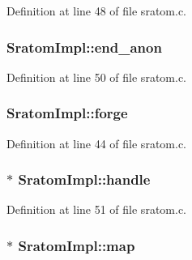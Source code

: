 Definition at line 48 of file sratom.\+c.

\subsubsection[{\texorpdfstring{end\+\_\+anon}{end_anon}}]{ Sratom\+Impl\+::end\+\_\+anon}\hypertarget{struct_sratom_impl_a25160f17a4038f0129c9423cca760684}{}\label{struct_sratom_impl_a25160f17a4038f0129c9423cca760684}


Definition at line 50 of file sratom.\+c.

\subsubsection[{\texorpdfstring{forge}{forge}}]{ Sratom\+Impl\+::forge}\hypertarget{struct_sratom_impl_af56a9a1fff79b6fddcfc67d138d1a0e6}{}\label{struct_sratom_impl_af56a9a1fff79b6fddcfc67d138d1a0e6}


Definition at line 44 of file sratom.\+c.

\subsubsection[{\texorpdfstring{handle}{handle}}]{$\ast$ Sratom\+Impl\+::handle}\hypertarget{struct_sratom_impl_ae086890e70ea8b6c9fbd395cac361eac}{}\label{struct_sratom_impl_ae086890e70ea8b6c9fbd395cac361eac}


Definition at line 51 of file sratom.\+c.

\subsubsection[{\texorpdfstring{map}{map}}]{$\ast$ Sratom\+Impl\+::map}\hypertarget{struct_sratom_impl_a49ce358076dcde352a47bcdb12e66af9}{}\label{struct_sratom_impl_a49ce358076dcde352a47bcdb12e66af9}


